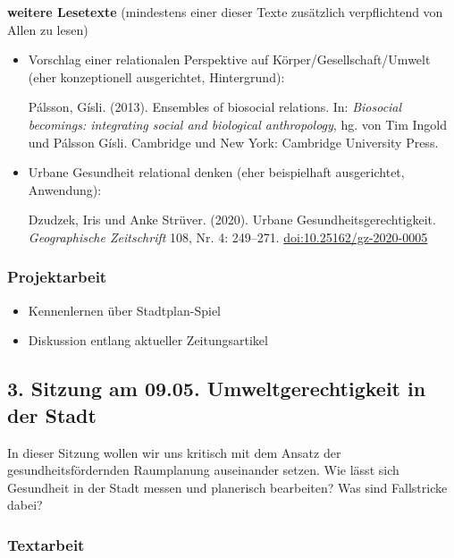 \documentclass[
  ngerman,
]{article}
\providecommand{\tightlist}{%
  \setlength{\itemsep}{0pt}\setlength{\parskip}{0pt}}
\begin{document}
\textbf{weitere Lesetexte}
(mindestens einer dieser Texte zusätzlich verpflichtend von Allen zu lesen)

\begin{itemize}
\item
  Vorschlag einer relationalen Perspektive auf Körper/Gesellschaft/Umwelt (eher konzeptionell ausgerichtet, Hintergrund):

  Pálsson, Gísli. (2013). Ensembles of biosocial relations. In: \emph{Biosocial becomings: integrating social and biological anthropology}, hg. von Tim Ingold und Pálsson Gísli. Cambridge und New York: Cambridge University Press.
\item
  Urbane Gesundheit relational denken (eher beispielhaft ausgerichtet, Anwendung):

  Dzudzek, Iris und Anke Strüver. (2020). Urbane Gesundheitsgerechtigkeit. \emph{Geographische Zeitschrift} 108, Nr. 4: 249--271. \url{doi:10.25162/gz-2020-0005}
\end{itemize}

\hypertarget{projektarbeit}{%
\subsubsection*{Projektarbeit}\label{projektarbeit}}

\begin{itemize}
\tightlist
\item
  Kennenlernen über Stadtplan-Spiel
\item
  Diskussion entlang aktueller Zeitungsartikel
\end{itemize}

\hypertarget{sitzung-am-09.05.-umweltgerechtigkeit-in-der-stadt}{%
\subsection*{3. Sitzung am 09.05. \textbar{} Umweltgerechtigkeit in der Stadt}\label{sitzung-am-09.05.-umweltgerechtigkeit-in-der-stadt}}

In dieser Sitzung wollen wir uns kritisch mit dem Ansatz der gesundheitsfördernden Raumplanung auseinander setzen. Wie lässt sich Gesundheit in der Stadt messen und planerisch bearbeiten? Was sind Fallstricke dabei?

\hypertarget{textarbeit-2}{%
\subsubsection*{Textarbeit}\label{textarbeit-2}}
\end{document}

